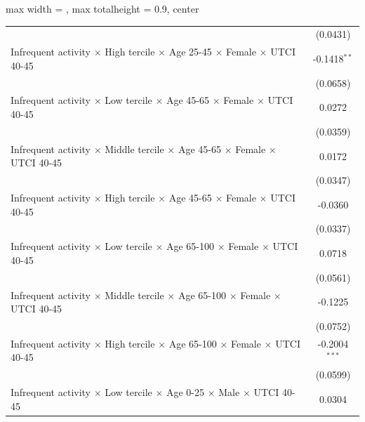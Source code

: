 \begin{table}[htbp]
\begin{adjustbox}{max width = \textwidth, max totalheight = 0.9\textheight, center}
\begin{tabular}{lc}
                                                                                                                 & (0.0431)\\   
         Infrequent activity $\times$ High tercile $\times$ Age 25-45 $\times$ Female $\times$ UTCI 40-45        & -0.1418$^{**}$\\   
                                                                                                                 & (0.0658)\\   
         Infrequent activity $\times$ Low tercile $\times$ Age 45-65 $\times$ Female $\times$ UTCI 40-45         & 0.0272\\   
                                                                                                                 & (0.0359)\\   
         Infrequent activity $\times$ Middle tercile $\times$ Age 45-65 $\times$ Female $\times$ UTCI 40-45      & 0.0172\\   
                                                                                                                 & (0.0347)\\   
         Infrequent activity $\times$ High tercile $\times$ Age 45-65 $\times$ Female $\times$ UTCI 40-45        & -0.0360\\   
                                                                                                                 & (0.0337)\\   
         Infrequent activity $\times$ Low tercile $\times$ Age 65-100 $\times$ Female $\times$ UTCI 40-45        & 0.0718\\   
                                                                                                                 & (0.0561)\\   
         Infrequent activity $\times$ Middle tercile $\times$ Age 65-100 $\times$ Female $\times$ UTCI 40-45     & -0.1225\\   
                                                                                                                 & (0.0752)\\   
         Infrequent activity $\times$ High tercile $\times$ Age 65-100 $\times$ Female $\times$ UTCI 40-45       & -0.2004$^{***}$\\   
                                                                                                                 & (0.0599)\\   
         Infrequent activity $\times$ Low tercile $\times$ Age 0-25 $\times$ Male $\times$ UTCI 40-45            & 0.0304\\   

\end{tabular}
\end{adjustbox}
\end{table}
